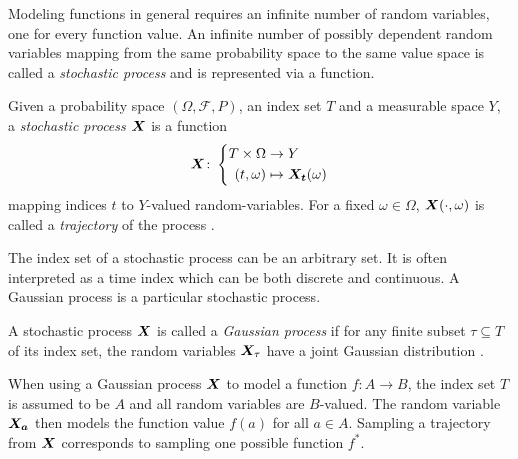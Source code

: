 Modeling functions in general requires an infinite number of random variables, one for every function value.
An infinite number of possibly dependent random variables mapping from the same probability space to the same value space is called a \emph{stochastic process} and is represented via a function.

\begin{definition}
    \label{def:stochastic_process}
    Given a probability space $(\Omega, \mathcal{F}, P)$, an index set $T$ and a measurable space $Y$, a \emph{stochastic process $\bm{X}$} is a function
    \begin{align}
        \bm{X} \colon \left\{\begin{aligned}
            T \times \Omega &\to Y \\
            (t, \omega) &\mapsto \bm{X_t}(\omega)
        \end{aligned}\right.
    \end{align}
    mapping indices $t$ to $Y$-valued random-variables.
    For a fixed $\omega \in \Omega$, $\bm{X}(\cdot, \omega)$ is called a \emph{trajectory} of the process \cite{astrom_introduction_1971}.
\end{definition}

The index set of a stochastic process can be an arbitrary set.
It is often interpreted as a time index which can be both discrete and continuous.
A Gaussian process is a particular stochastic process.
\begin{definition}
    \label{def:gaussian_process}
    A stochastic process $\bm{X}$ is called a \emph{Gaussian process} if for any finite subset $\tau \subseteq T$ of its index set, the random variables $\bm{X}_\tau$ have a joint Gaussian distribution \cite{astrom_introduction_1971}.
\end{definition}
When using a Gaussian process $\bm{X}$ to model a function $f \colon A \to B$, the index set $T$ is assumed to be $A$ and all random variables are $B$-valued.
The random variable $\bm{X_a}$ then models the function value $f(a)$ for all $a \in A$.
Sampling a trajectory from $\bm{X}$ corresponds to sampling one possible function $f^\ast$.

